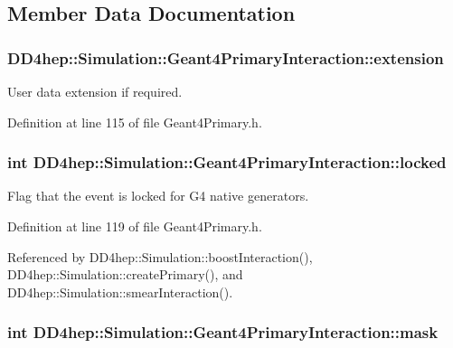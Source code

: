 \subsection{Member Data Documentation}
\hypertarget{class_d_d4hep_1_1_simulation_1_1_geant4_primary_interaction_a5b906f3249844ff63ea285eb633003d8}{
\subsubsection[{extension}]{ {\bf DD4hep::Simulation::Geant4PrimaryInteraction::extension}}}
\label{class_d_d4hep_1_1_simulation_1_1_geant4_primary_interaction_a5b906f3249844ff63ea285eb633003d8}


User data extension if required. 

Definition at line 115 of file Geant4Primary.h.\hypertarget{class_d_d4hep_1_1_simulation_1_1_geant4_primary_interaction_a29b9944b1c56dbbc422320f6bc5a3a85}{
\subsubsection[{locked}]{\setlength{\rightskip}{0pt plus 5cm}int {\bf DD4hep::Simulation::Geant4PrimaryInteraction::locked}}}
\label{class_d_d4hep_1_1_simulation_1_1_geant4_primary_interaction_a29b9944b1c56dbbc422320f6bc5a3a85}


Flag that the event is locked for G4 native generators. 

Definition at line 119 of file Geant4Primary.h.

Referenced by DD4hep::Simulation::boostInteraction(), DD4hep::Simulation::createPrimary(), and DD4hep::Simulation::smearInteraction().\hypertarget{class_d_d4hep_1_1_simulation_1_1_geant4_primary_interaction_a0b4d8c22740846c3d812a13c1048b594}{
\subsubsection[{mask}]{\setlength{\rightskip}{0pt plus 5cm}int {\bf DD4hep::Simulation::Geant4PrimaryInteraction::mask}}}
\label{class_d_d4hep_1_1_simulation_1_1_geant4_primary_interaction_a0b4d8c22740846c3d812a13c1048b594}


